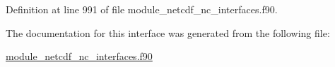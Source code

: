 Definition at line 991 of file module\+\_\+netcdf\+\_\+nc\+\_\+interfaces.\+f90.



The documentation for this interface was generated from the following file\+:\begin{DoxyCompactItemize}
\item 
\hyperlink{module__netcdf__nc__interfaces_8f90}{module\+\_\+netcdf\+\_\+nc\+\_\+interfaces.\+f90}\end{DoxyCompactItemize}
